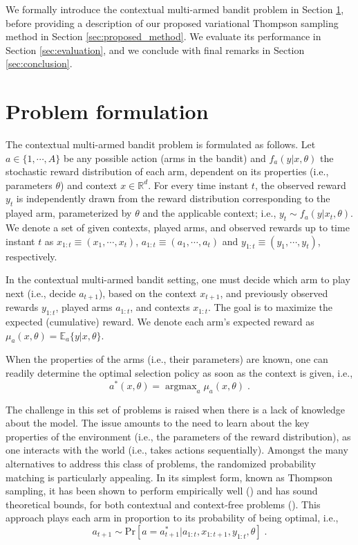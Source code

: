 \documentclass[10pt]{article}
\def \Real{{\mathbb R}}
\newcommand{\ie}{i.e., }
\newcommand{\argmax}{\mathop{\mathrm{argmax}}}
\begin{document}
We formally introduce the contextual multi-armed bandit problem in Section \ref{sec:problem_formulation}, before providing a description of our proposed variational Thompson sampling method in Section \ref{sec:proposed_method}. We evaluate its performance in Section \ref{sec:evaluation}, and we conclude with final remarks in Section \ref{sec:conclusion}.

\section{Problem formulation}
\label{sec:problem_formulation}

The contextual multi-armed bandit problem is formulated as follows. Let $a\in\{1,\cdots,A\}$ be any possible action (arms in the bandit) and $f_{a}(y|x,\theta)$ the stochastic reward distribution of each arm, dependent on its properties (\ie parameters $\theta$) and context $x\in\Real^{d}$. For every time instant $t$, the observed reward $y_t$ is independently drawn from the reward distribution corresponding to the played arm, parameterized by $\theta$ and the applicable context; \ie $y_t\sim f_{a}(y|x_t,\theta)$. We denote a set of given contexts, played arms, and observed rewards up to time instant $t$ as $x_{1:t} \equiv (x_1, \cdots , x_t)$, $a_{1:t} \equiv (a_1, \cdots , a_t)$ and $y_{1:t} \equiv (y_1, \cdots , y_t)$, respectively.

In the contextual multi-armed bandit setting, one must decide which arm to play next (\ie decide $a_{t+1}$), based on the context $x_{t+1}$, and previously observed rewards $y_{1:t}$, played arms $a_{1:t}$, and contexts $x_{1:t}$. The goal is to maximize the expected (cumulative) reward. We denote each arm's expected reward as $\mu_{a}(x,\theta)=\mathbb{E}_{a}\{y|x,\theta\}$. 

When the properties of the arms (\ie their parameters) are known, one can readily determine the optimal selection policy as soon as the context is given, \ie
		\begin{equation}
		a^*(x,\theta)=\argmax_{a}\mu_{a}(x,\theta) \; .
		\end{equation}
		
The challenge in this set of problems is raised when there is a lack of knowledge about the model. The issue amounts to the need to learn about the key properties of the environment (\ie the parameters of the reward distribution), as one interacts with the world (\ie takes actions sequentially). Amongst the many alternatives to address this class of problems, the randomized probability matching is particularly appealing. In its simplest form, known as Thompson sampling, it has been shown to perform empirically well (\cite{ic-Chapelle2011, j-Scott2015}) and has sound theoretical bounds, for both contextual and context-free problems (\cite{j-Agrawal2012,j-Agrawal2012a}). This approach plays each arm in proportion to its probability of being optimal, \ie
\begin{equation}
a_{t+1} \sim \mathrm{Pr}\left[a=a_{t+1}^*|a_{1:t}, x_{1:t+1}, y_{1:t}, \theta \right] \;.
\end{equation} 
\end{document}
